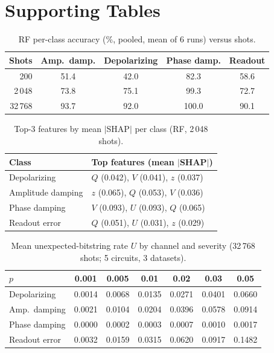 \documentclass[conference]{IEEEtran}
\begin{document}
\section{Supporting Tables}\label{app:tables}
\begin{table}[!h]
\caption{RF per-class accuracy (\%, pooled, mean of 6 runs) versus shots.}
\label{tab:class}
\centering\scriptsize\setlength{\tabcolsep}{3pt}
\begin{tabular}{@{}rcccc@{}}
\toprule
Shots & Amp.\ damp. & Depolarizing & Phase damp. & Readout\\
\midrule
200 & 51.4 & 42.0 & 82.3 & 58.6\\
2\,048 & 73.8 & 75.1 & 99.3 & 72.7\\
32\,768 & 93.7 & 92.0 & 100.0 & 90.1\\
\bottomrule
\end{tabular}
\end{table}

\begin{table}[!h]
\caption{Top-3 features by mean $|$SHAP$|$ per class (RF, 2\,048 shots).}
\label{tab:shaptab}
\centering\scriptsize\setlength{\tabcolsep}{3pt}
\begin{tabular}{@{}ll@{}}
\toprule
Class & Top features (mean $|$SHAP$|$)\\
\midrule
Depolarizing & $Q$ (0.042), $V$ (0.041), $z$ (0.037)\\
Amplitude damping & $z$ (0.065), $Q$ (0.053), $V$ (0.036)\\
Phase damping & $V$ (0.093), $U$ (0.093), $Q$ (0.065)\\
Readout error & $Q$ (0.051), $U$ (0.031), $z$ (0.029)\\
\bottomrule
\end{tabular}
\end{table}

\begin{table}[!h]
\caption{Mean unexpected-bitstring rate $U$ by channel and severity (32\,768 shots; 5 circuits, 3 datasets).}
\label{tab:utab}
\centering\scriptsize\setlength{\tabcolsep}{3pt}
\begin{tabular}{@{}lcccccc@{}}
\toprule
$p$ & 0.001 & 0.005 & 0.01 & 0.02 & 0.03 & 0.05\\
\midrule
Depolarizing & 0.0014 & 0.0068 & 0.0135 & 0.0271 & 0.0401 & 0.0660\\
Amp.\ damping & 0.0021 & 0.0104 & 0.0204 & 0.0396 & 0.0578 & 0.0914\\
Phase damping & 0.0000 & 0.0002 & 0.0003 & 0.0007 & 0.0010 & 0.0017\\
Readout error & 0.0032 & 0.0159 & 0.0315 & 0.0620 & 0.0917 & 0.1482\\
\bottomrule
\end{tabular}
\end{table}
\end{document}
